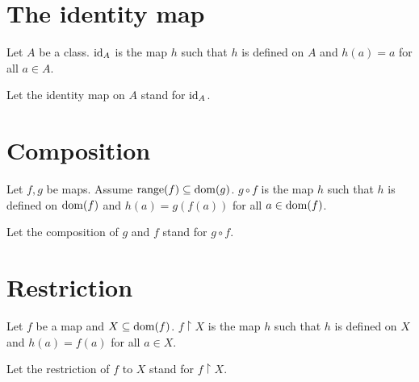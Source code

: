 \documentclass[../../set-theory/set-theory.tex]{subfiles}
\begin{document}
  \section{The identity map}

  \begin{forthel}
    \begin{definition}
      Let $A$ be a class.
      $\operatorname{id}_{A}$ is the map $h$ such that $h$ is defined on $A$ and $h(a) = a$ for all $a \in A$.
    \end{definition}

    Let the identity map on $A$ stand for $\operatorname{id}_{A}$.
  \end{forthel}


  \section{Composition}

  \begin{forthel}
    \begin{definition}
      Let $f, g$ be maps.
      Assume $\operatorname{range}(f) \subseteq \operatorname{dom}(g)$.
      $g \circ f$ is the map $h$ such that $h$ is defined on $\operatorname{dom}(f)$ and $h(a) = g(f(a))$ for all $a \in \operatorname{dom}(f)$.
    \end{definition}

    Let the composition of $g$ and $f$ stand for $g \circ f$.
  \end{forthel}


  \section{Restriction}

  \begin{forthel}
    \begin{definition}
      Let $f$ be a map and $X \subseteq \operatorname{dom}(f)$.
      $f \restriction X$ is the map $h$ such that $h$ is defined on $X$ and $h(a) = f(a)$ for all $a \in X$.
    \end{definition}

    Let the restriction of $f$ to $X$ stand for $f \restriction X$.
  \end{forthel}
\end{document}
